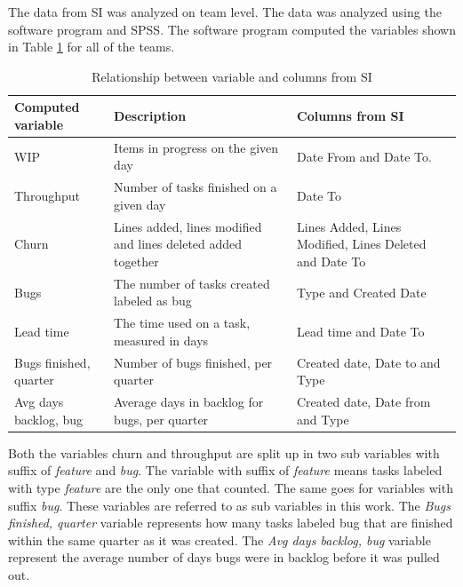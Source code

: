 \documentclass[UKenglish]{ifimaster}  %
\begin{document}
The data from SI was analyzed on team level. The data was analyzed using the software program and SPSS. The software program computed the variables shown in Table \ref{des} for all of the teams.
\newpage
\begin{table}[htbp]
\begin{center}
    \begin{tabular}{| l | p{5cm} |  p{5cm} |}
    \hline
    \bf{Computed variable} &	\bf{Description}	 & \bf{Columns from SI}\\ \hline 
     WIP & \parbox[t]{5cm}{Items in progress on the given day} & Date From and Date To. \\ \hline
     Throughput	& Number of tasks finished on a given day & Date To \\ \hline
     Churn & Lines added, lines modified and lines deleted added together & Lines Added, Lines Modified, Lines Deleted and Date To \\ \hline
    Bugs & The number of tasks created labeled as bug & Type and Created Date \\ \hline
    Lead time & The time used on a task, measured in days & Lead time and Date To \\ \hline
    Bugs finished, quarter & Number of bugs finished, per quarter &Created date, Date to and Type \\ \hline
    Avg days backlog, bug & Average days in backlog for bugs, per quarter & Created date, Date from and Type \\ \hline
  \end{tabular}
\caption{Relationship between variable and columns from SI}
\label{des} %
\end{center}
\end{table}

 
Both the variables churn and throughput are split up in two sub variables with suffix of \textit{feature} and \textit{bug}. The variable with suffix of \textit{feature} means tasks labeled with type \textit{feature} are the only one that counted. The same goes for variables with suffix \textit{bug}. These variables are referred to as sub variables in this work.  The \textit{Bugs finished, quarter} variable represents how many tasks labeled bug that are finished within the same quarter as it was created.  The \textit{Avg days backlog, bug} variable represent the average number of days bugs were in backlog before it was pulled out. %
\end{document}
